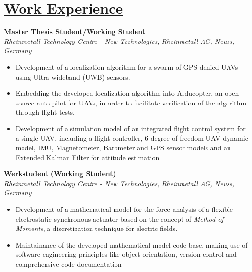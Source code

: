 
\section{\underline{Work Experience}}

\large{\textbf{Master Thesis Student/Working Student}}
\hfill
\masterarbeitdate\\
\large{\emph{Rheinmetall Technology Centre - New Technologies, Rheinmetall AG, Neuss, Germany}}
\begin{itemize}
	\item Development of a localization algorithm for a swarm of GPS-denied UAVs using Ultra-wideband (UWB) sensors.
	\item Embedding the developed localization algorithm into Arducopter, an open-source auto-pilot for UAVs, in order to facilitate verification of the algorithm through flight tests.
    \item Development of a simulation model of an integrated flight control system for a single UAV, including a flight controller, 6 degree-of-freedom UAV dynamic model, IMU, Magnetometer, Barometer and GPS sensor models and an Extended Kalman Filter for attitude estimation.
\end{itemize}

\vspace{0.1 in}

\large{\textbf{Werkstudent (Working Student)}}
\hfill
\rheinmetalldate\\
\large{\emph{Rheinmetall Technology Centre - New Technologies, Rheinmetall AG, Neuss, Germany}}
\begin{itemize}
\item\large{Development of a mathematical model for the force analysis of a flexible electrostatic synchronous actuator based on the concept of \emph{Method of Moments}, a discretization technique for electric fields.}
\item\large{Maintainance of the developed mathematical model code-base, making use of software engineering principles like object orientation, version control and comprehensive code documentation}
\end{itemize}


